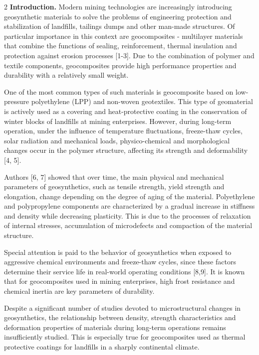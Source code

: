 \begin{multicols}{2}
{\bfseries Introduction.} Modern mining technologies are increasingly
introducing geosynthetic materials to solve the problems of engineering
protection and stabilization of landfills, tailings dumps and other
man-made structures. Of particular importance in this context are
geocomposites - multilayer materials that combine the functions of
sealing, reinforcement, thermal insulation and protection against
erosion processes {[}1-3{]}. Due to the combination of polymer and
textile components, geocomposites provide high performance properties
and durability with a relatively small weight.

One of the most common types of such materials is geocomposite based on
low-pressure polyethylene (LPP) and non-woven geotextiles. This type of
geomaterial is actively used as a covering and heat-protective coating
in the conservation of winter blocks of landfills at mining enterprises.
However, during long-term operation, under the influence of temperature
fluctuations, freeze-thaw cycles, solar radiation and mechanical loads,
physico-chemical and morphological changes occur in the polymer
structure, affecting its strength and deformability {[}4, 5{]}.

Authors {[}6, 7{]} showed that over time, the main physical and
mechanical parameters of geosynthetics, such as tensile strength, yield
strength and elongation, change depending on the degree of aging of the
material. Polyethylene and polypropylene components are characterized by
a gradual increase in stiffness and density while decreasing plasticity.
This is due to the processes of relaxation of internal stresses,
accumulation of microdefects and compaction of the material structure.

Special attention is paid to the behavior of geosynthetics when exposed
to aggressive chemical environments and freeze-thaw cycles, since these
factors determine their service life in real-world operating conditions
{[}8,9{]}. It is known that for geocomposites used in mining
enterprises, high frost resistance and chemical inertia are key
parameters of durability.

Despite a significant number of studies devoted to microstructural
changes in geosynthetics, the relationship between density, strength
characteristics and deformation properties of materials during long-term
operations remains insufficiently studied. This is especially true for
geocomposites used as thermal protective coatings for landfills in a
sharply continental climate.


\end{multicols}
